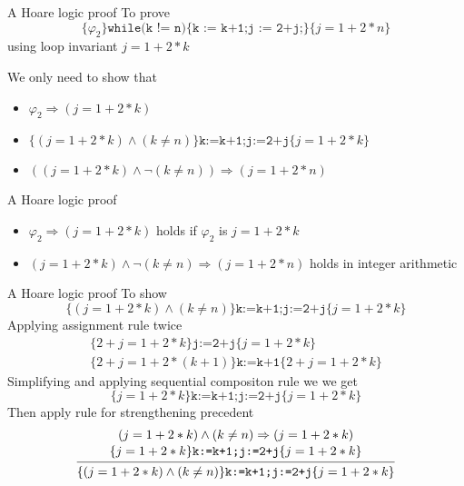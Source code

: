 \documentclass[presentation]{beamer}
\begin{document}
\begin{frame}[label={sec:org45e6eae}]{A Hoare logic proof}
To prove
\begin{equation*}
\{\varphi_2\}\texttt{while(k != n)\{k := k+1;j := 2+j;\}}\{j=1+2*n\}
\end{equation*}
using loop invariant \(j=1+2*k\)

We only need to show that
\begin{itemize}
\item \(\varphi_2\Rightarrow(j=1+2*k)\)
\item \(\{(j=1+2*k)\wedge(k\neq n)\}\texttt{k:=k+1;j:=2+j}\{j=1+2*k\}\)
\item \(((j=1+2*k)\wedge\neg(k\neq n))\Rightarrow(j=1+2*n)\)
\end{itemize}
\end{frame}
\begin{frame}[label={sec:org96c7d46}]{A Hoare logic proof}
\begin{itemize}
\item \(\varphi_2\Rightarrow(j=1+2*k)\) holds if \(\varphi_2\) is \(j=1+2*k\)
\item \((j=1+2*k)\wedge\neg(k\neq n)\Rightarrow(j=1+2*n)\) holds in integer arithmetic
\end{itemize}
\end{frame}
\begin{frame}[label={sec:orgd44ecf6}]{A Hoare logic proof}
To show
\begin{equation*}
\{(j=1+2*k)\wedge(k\neq n)\}\texttt{k:=k+1;j:=2+j}\{j=1+2*k\}
\end{equation*}
Applying assignment rule twice
\begin{gather*}
\{2+j=1+2*k\}\texttt{j:=2+j}\{j=1+2*k\}\\
\{2+j=1+2*(k+1)\}\texttt{k:=k+1}\{2+j=1+2*k\}
\end{gather*}
Simplifying and applying sequential compositon rule we we get
\begin{equation*}
\{j=1+2*k\}\texttt{k:=k+1;j:=2+j}\{j=1+2*k\}
\end{equation*}
Then apply rule for strengthening precedent
\begin{equation*}
\begin{prooftree}%
\hypo{(j=1+2*k)\wedge(k\neq n)\Rightarrow(j=1+2*k)}
\infer[no rule]1{\{j=1+2*k\}\texttt{k:=k+1;j:=2+j}\{j=1+2*k\}}
\infer1{\{(j=1+2*k)\wedge(k\neq n)\}\texttt{k:=k+1;j:=2+j}\{j=1+2*k\}}
\end{prooftree}
\end{equation*}
\end{frame}
\end{document}
